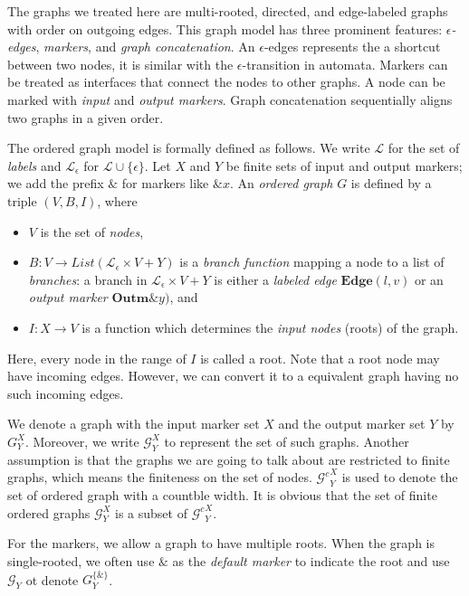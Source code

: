 \documentclass{llncs}
\newcommand{\Gc}{{\mathcal{G}^{c}}}
\newcommand{\G}{\mathcal{G}}
\begin{document}
The graphs we treated here are multi-rooted, directed, and edge-labeled graphs with order on outgoing edges. This graph model has three prominent features: \emph{$\epsilon$-edges}, \emph{markers}, and \emph{graph concatenation}. An $\epsilon$-edges represents the a shortcut between two nodes, it is similar with the $\epsilon$-transition in automata. Markers can be treated as interfaces that connect the nodes to other graphs. A node can be marked with \emph{input} and \emph{output markers}. Graph concatenation sequentially aligns two graphs in a given order.

The ordered graph model is formally defined as follows. We write $\mathcal{L}$ for the set of \emph{labels} and $\mathcal{L}_{\epsilon}$ for $\mathcal{L}\cup\{\epsilon\}$. Let $X$ and $Y$ be finite sets of input and output markers; we add the prefix $\&$ for markers like $\& x$.
    An \emph{ordered graph} $G$ is defined by a triple $(V,B,I)$, where
    \begin{itemize}
        \item $V$ is the set of \emph{nodes},
        \item $B:V\rightarrow List(\mathcal{L}_{\epsilon}\times V+Y)$ is a \emph{branch function} mapping a node to a list of \emph{branches}: a branch in $\mathcal{L}_{\epsilon}\times V+Y$ is either a \emph{labeled edge} $\mathbf{Edge}(l,v)$ or an \emph{output marker} $\mathbf{Outm}\&y)$, and
        \item $I:X \rightarrow V$ is a function which determines the \emph{input nodes} (roots) of the graph.
    \end{itemize}

Here, every node in the range of $I$ is called a root. Note that a root node may have incoming edges. However, we can convert it to a equivalent graph having no such incoming edges.

We denote a graph with the input marker set $X$ and the output marker set $Y$ by $G^X_Y$. Moreover, we write $\G^X_Y$ to represent the set of such graphs. Another assumption is that the graphs we are going to talk about are restricted to finite graphs, which means the finiteness on the set of nodes. $\Gc^X_Y$ is used to denote the set of ordered graph with a countble width. It is obvious that the set of finite ordered graphs $\G^X_Y$ is a subset of $\Gc^X_Y$.

For the markers, we allow a graph to have multiple roots. When the graph is single-rooted, we often use $\&$ as the \emph{default marker} to indicate the root and use $\G_Y$ ot denote $G^{\{\&\}}_Y$. 
\end{document}
